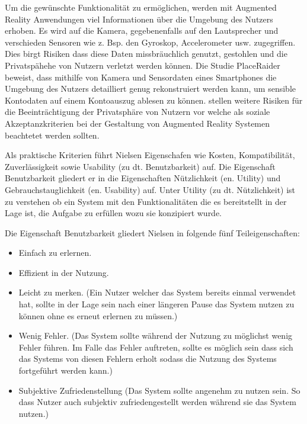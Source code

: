 Um die gewünschte Funktionalität zu ermöglichen, werden mit Augmented Reality Anwendungen viel Informationen über die Umgebung des Nutzers erhoben.\cite[S.~3]{Roesner2013} Es wird auf die Kamera, gegebenenfalls 
auf den Lautsprecher und verschieden Sensoren wie z. Bsp. den Gyroskop, Accelerometer usw. zugegriffen. Dies birgt Risiken dass diese Daten missbräuchlich genutzt, gestohlen und die Privatspähehe von Nutzern 
verletzt werden können. \cite[S.~9]{Templeman2012} Die Studie PlaceRaider beweist, dass mithilfe von Kamera und Sensordaten eines Smartphones die Umgebung des Nutzers detailliert genug
rekonstruiert werden kann, um sensible Kontodaten auf einem Kontoauszug ablesen zu können. \cite{Roesner2013,Lebeck2018} stellen weitere Risiken für die Beeinträchtigung der Privatsphäre von Nutzern vor welche als 
soziale Akzeptanzkriterien bei der Gestaltung von Augmented Reality Systemen beachtetet werden sollten. 

Als praktische Kriterien führt Nielsen Eigenschafen wie Kosten, Kompatibilität, Zuverlässigkeit sowie Usability (zu dt. Benutzbarkeit) auf. Die Eigenschaft Benutzbarkeit gliedert er in die Eigenschaften Nützlichkeit (en. Utility) und Gebrauchstauglichkeit (en. Usability) auf. Unter Utility (zu dt. Nützlichkeit) ist zu verstehen ob ein System mit den Funktionalitäten die es bereitstellt in der Lage ist, die Aufgabe zu erfüllen wozu sie konzipiert wurde.

Die Eigenschaft Benutzbarkeit gliedert Nielsen in folgende fünf Teileigenschaften: 

\begin{itemize}
	\item Einfach zu erlernen.
	\item Effizient in der Nutzung.
	\item Leicht zu merken. (Ein Nutzer welcher das System bereits einmal verwendet hat, sollte in der Lage sein nach einer längeren Pause das System nutzen zu können ohne es erneut erlernen zu müssen.)
	\item Wenig Fehler. (Das System sollte während der Nutzung zu möglichst wenig Fehler führen. Im Falle das Fehler auftreten, sollte es möglich sein dass sich das Systems von diesen Fehlern erholt sodass die Nutzung des Systems fortgeführt werden kann.)
	\item Subjektive Zufriedenstellung (Das System sollte angenehm zu nutzen sein. So dass Nutzer auch subjektiv zufriedengestellt werden während sie das System nutzen.)
\end{itemize}


